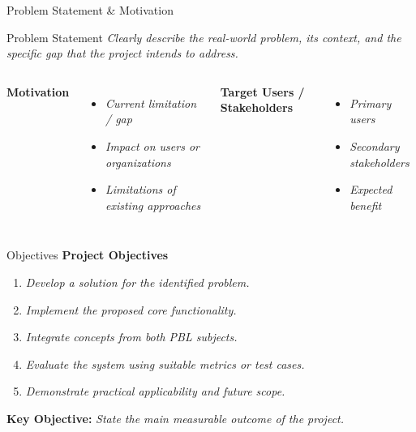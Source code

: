 \documentclass[aspectratio=169,11pt]{beamer}
\newcommand{\placeholder}[1]{\textit{\color{GEUGrey}#1}}
\begin{document}
\begin{frame}{Problem Statement \& Motivation}
\begin{block}{Problem Statement}
\placeholder{Clearly describe the real-world problem, its context, and the specific gap that the project intends to address.}
\end{block}
\vspace{2mm}
\begin{columns}[T,totalwidth=\textwidth]
\textbf{\color{GEUBlue}Motivation}
\begin{itemize}\itemsep2pt
\item \placeholder{Current limitation / gap}
\item \placeholder{Impact on users or organizations}
\item \placeholder{Limitations of existing approaches}
\end{itemize}
\textbf{\color{GEUBlue}Target Users / Stakeholders}
\begin{itemize}\itemsep2pt
\item \placeholder{Primary users}
\item \placeholder{Secondary stakeholders}
\item \placeholder{Expected benefit}
\end{itemize}
\end{columns}
\end{frame}

\begin{frame}{Objectives}
\textbf{\color{GEUBlue}Project Objectives}
\vspace{2mm}
\begin{enumerate}\itemsep5pt
\item \placeholder{Develop a solution for the identified problem.}
\item \placeholder{Implement the proposed core functionality.}
\item \placeholder{Integrate concepts from both PBL subjects.}
\item \placeholder{Evaluate the system using suitable metrics or test cases.}
\item \placeholder{Demonstrate practical applicability and future scope.}
\end{enumerate}
\vfill
\begin{center}
\colorbox{GEULightBlue}{\parbox{.80\textwidth}{\centering
\textbf{Key Objective:} \placeholder{State the main measurable outcome of the project.}}}
\end{center}
\end{frame}
\end{document}
